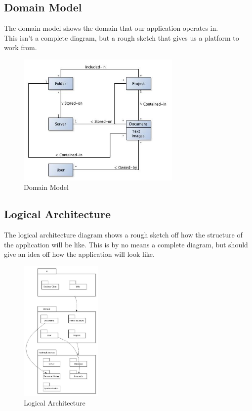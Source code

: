 \documentclass[11pt]{article}
\begin{document}
\subsection{Domain Model}
\label{sec-2-3}
The domain model shows the domain that our application operates in. \\
This isn't a complete diagram, but a rough sketch that gives us a platform to work from.
\begin{figure}[H]
  		\centering
    	\includegraphics[width=300px]{images/DomainModel.jpg}
    	\caption{Domain Model}
\end{figure}
\newpage
\subsection{Logical Architecture}
\label{sec-2-4}

   The logical architecture diagram shows a rough sketch off how the structure of the application
   will be like. This is by no means a complete diagram, but should give an idea off how
   the application will look like.
\begin{figure}[H]
  		\centering
    	\includegraphics[width=150px]{images/LogicalArchitecture.jpg}
    	\caption{Logical Architecture}
\end{figure}
\end{document}
